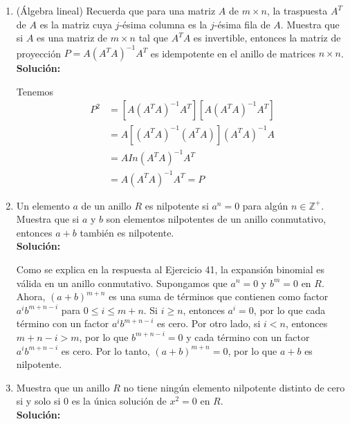 \begin{enumerate}
\begin{itemize}
	\end{itemize}
	
	\item (Álgebra lineal) Recuerda que para una matriz $A$ de $m \times n$, la traspuesta $A^T$ de $A$ es la matriz cuya $j$-ésima columna es la $j$-ésima fila de $A$. Muestra que si $A$ es una matriz de $m \times n$ tal que $A^TA$ es invertible, entonces la matriz de proyección $P = A(A^TA)^{-1}A^T$ es idempotente en el anillo de matrices $n \times n$.
	\\ \textbf{Solución:}
	
	Tenemos 
	\begin{align*}
		P^2 &= [A(A^TA)^{-1}A^T][A(A^TA)^{-1}A^T]\\
		&= A[(A^TA)^{-1}(A^TA)](A^TA)^{-1}A \\
		&= AIn(A^TA)^{-1}A^T \\ &= A(A^TA)^{-1}A^T = P
	\end{align*}
	
	
	\item  Un elemento $a$ de un anillo $R$ es nilpotente si $a^n = 0$ para algún $n \in \mathbb{Z}^+$. Muestra que si $a$ y $b$ son elementos nilpotentes de un anillo conmutativo, entonces $a + b$ también es nilpotente.
	\\ \textbf{Solución:}
	
	Como se explica en la respuesta al Ejercicio 41, la expansión binomial es válida en un anillo conmutativo. Supongamos que $a^n = 0$ y $b^m = 0$ en $R$. Ahora, $(a + b)^{m+n}$ es una suma de términos que contienen como factor $a^i b^{m+n-i}$ para $0 \leq i \leq m + n$. Si $i \geq n$, entonces $a^i = 0$, por lo que cada término con un factor $a^i b^{m+n-i}$ es cero. Por otro lado, si $i < n$, entonces $m + n - i > m$, por lo que $b^{m+n-i} = 0$ y cada término con un factor $a^i b^{m+n-i}$ es cero. Por lo tanto, $(a + b)^{m+n} = 0$, por lo que $a + b$ es nilpotente.
	
	\item  Muestra que un anillo $R$ no tiene ningún elemento nilpotente distinto de cero si y solo si $0$ es la única solución de $x^2 = 0$ en $R$.
	\\ \textbf{Solución:}
	

\end{enumerate}
